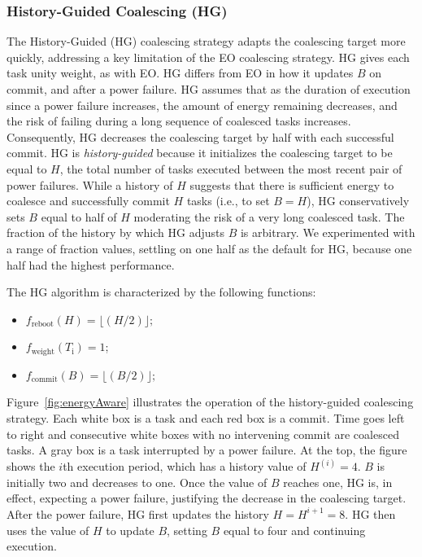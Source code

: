 \subsubsection{History-Guided Coalescing (HG)}
\label{subsec:energyAware}

The History-Guided (HG) coalescing strategy adapts the coalescing target more
quickly, addressing a key limitation of the EO coalescing strategy.  
%
HG gives each task unity weight, as with EO.  
%
HG differs from EO in how it updates $B$ on commit, and after a power failure.
%
HG assumes that as the duration of execution since a power failure increases,
the amount of energy remaining decreases, and the risk of failing during a long
sequence of coalesced tasks increases.  
%
Consequently, HG decreases the coalescing target by half with each successful commit.
%
HG is {\em history-guided} because it initializes the coalescing target to be
equal to $H$, the total number of tasks executed between the most recent pair
of power failures.
%
While a history of $H$ suggests that there is sufficient energy to coalesce and
successfully commit $H$ tasks (i.e., to set $B = H$), HG conservatively sets $B$ equal to half
of $H$ moderating the risk of a very long coalesced task. 
%
The fraction of the history by which HG adjusts $B$ is arbitrary.
We experimented with a range of fraction values, settling on one half as the
default for HG, because one half had the highest performance. 



The HG algorithm is characterized by the following functions: 

\begin{itemize}
\item $f_\text{reboot}(H) = \lfloor(H / 2)\rfloor;$
\item $f_\text{weight}(T_\text{i}) =  1$; 
\item $f_\text{commit}(B) = \lfloor(B / 2)\rfloor;$ 
\end{itemize}

Figure~\ref{fig:energyAware} illustrates the operation of the history-guided
coalescing strategy.  Each white box is a task and each red box is a commit.
Time goes left to right and consecutive white boxes with no intervening commit
are coalesced tasks.  A gray box is a task interrupted by a power failure.  At
the top, the figure shows the $i$th execution period, which has a history
value of $H^{(i)} = 4$.  $B$ is initially two and decreases to one.  Once the
value of $B$ reaches one, HG is, in effect, expecting a power failure,
justifying the decrease in the coalescing target.  After the power failure, HG
first updates the history $H = H^{i+1} = 8$. HG then uses the value of $H$ to
update $B$, setting $B$ equal to four and continuing execution.  

